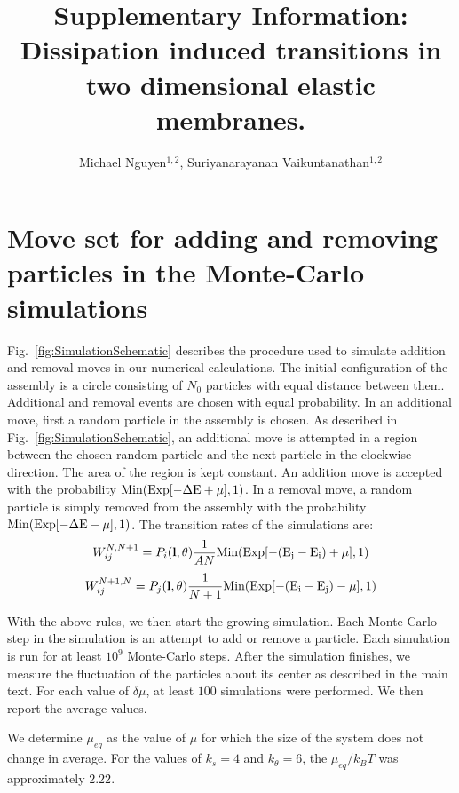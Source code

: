 \documentclass[amsmath,preprintnumbers,10pt,nofootinbib,prl,twocolumn]{revtex4-1}
\begin{document}
\title{Supplementary Information: Dissipation induced transitions in two dimensional elastic membranes.}
\author{Michael Nguyen$^{1,2}$, Suriyanarayanan Vaikuntanathan$^{1,2}$} 
\maketitle
\section{Move set for adding and removing particles in the Monte-Carlo simulations}
Fig.~\ref{fig:SimulationSchematic} describes the procedure used to simulate addition and removal moves in our numerical calculations. The initial configuration of the assembly is a circle consisting of $N_0$ particles with equal distance between them. Additional and removal events are chosen with equal probability. In an additional move, first a random particle in the assembly is chosen. As described in Fig.~\ref{fig:SimulationSchematic}, an additional move is attempted in a region between the chosen random particle and the next particle in the clockwise direction. The area of the region is kept constant.  An addition move is  accepted with the probability $\rm{Min}(\rm{Exp}[-\Delta E +\mu],1)$. In a removal move,  a random particle is simply removed from the assembly with the probability  $\rm{Min}(\rm{Exp}[-\Delta E -\mu],1)$. The transition rates of the simulations are:
\begin{equation}
W^{N,N+1}_{ij}=P_i(\bold{l},\bold{\theta})\frac{1}{AN}\rm{Min(Exp[-(E_j - E_i)+\mu],1)}
\end{equation}
\begin{equation}
W^{N+1,N}_{ij}=P_j(\bold{l},\bold{\theta})\frac{1}{N+1}\rm{Min(Exp[-(E_i - E_j)-\mu],1)}
\end{equation}

With the above rules, we then start the growing simulation. Each Monte-Carlo step in the simulation is an attempt to add or remove a particle. Each simulation is run for at least $10^9$ Monte-Carlo steps. After the simulation finishes, we measure the fluctuation of the particles about its center as described in the main text. For each value of $\delta\mu$, at least $100$ simulations were performed. We then report the average values.

We determine $\mu_{eq}$ as the value of $\mu$ for which the size of the system does not change in average. For the values of $k_s=4$ and $k_\theta$$=6$, the $\mu_{eq}/k_BT $ was approximately $2.22$.
\end{document}

